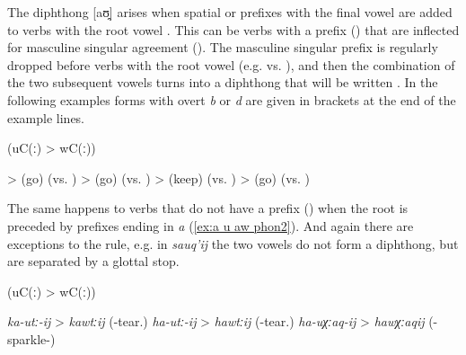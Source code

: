 The diphthong [aʊ̯] arises when spatial  or  prefixes with the final vowel  are added to verbs with the root vowel . This can be verbs with a  prefix () that are inflected for masculine singular  agreement (). The masculine singular prefix  is regularly dropped before verbs with the root vowel  (e.g.   vs.  ), and then the combination of the two subsequent vowels turns into a diphthong that will be written  . In the following examples forms with overt  \textit{b} or \textit{d} are given in brackets at the end of the example lines.
%
\begin{exe}
	 (uC(ː) > wC(ː)) \label{ex:a u aw phon}
	\begin{xlist}
		\ex	{} >   (go) (vs. ) 
		\ex	{} >   (go) (vs. )
		\ex	{} >   (keep) (vs. )
		\ex	{} >   (go) (vs. )
	\end{xlist}
\end{exe}

The same happens to verbs that do not have a  prefix () when the root is preceded by prefixes ending in \textit{a} (\ref{ex:a u aw phon2}). And again there are exceptions to the rule, e.g. in \textit{sauq'ij}  the two vowels do not form a diphthong, but are separated by a glottal stop.
%
\begin{exe}
	 (uC(ː) > wC(ː)) \label{ex:a u aw phon2}
	\begin{xlist}
		\ex	\textit{ka-utː-ij} > \textit{kawtːij}  (-tear.\tsc{ipfv-inf})
		\ex \textit{ha-utː-ij} > \textit{hawtːij}  (-tear.\tsc{ipfv-inf})
		\ex \textit{ha-uχːaq-ij} > \textit{hawχːaqij}  (-sparkle-\tsc{caus-inf})
	\end{xlist}
\end{exe}

